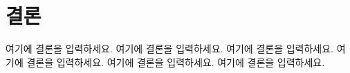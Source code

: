 \section{결\hspace{0.5em}론}

여기에 결론을 입력하세요. 여기에 결론을 입력하세요. 여기에 결론을 입력하세요.
여기에 결론을 입력하세요. 여기에 결론을 입력하세요. 여기에 결론을 입력하세요.
